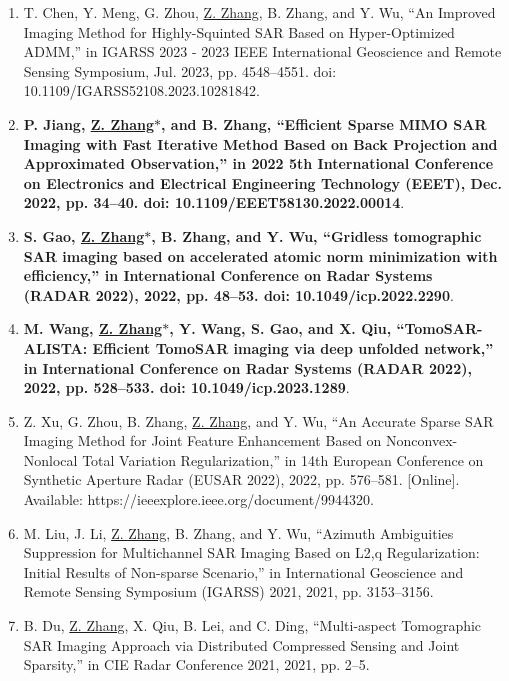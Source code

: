 \documentclass[paper=a4,fontsize=11pt]{scrartcl}
\begin{document}
\begin{enumerate}
\item T. Chen, Y. Meng, G. Zhou, \underline{Z. Zhang}, B. Zhang, and Y. Wu, ``An Improved Imaging Method for Highly-Squinted SAR Based on Hyper-Optimized ADMM,'' in IGARSS 2023 - 2023 IEEE International Geoscience and Remote Sensing Symposium, Jul. 2023, pp. 4548–4551. doi: 10.1109/IGARSS52108.2023.10281842.
	
\item \textbf{P. Jiang, \underline{Z. Zhang$\ast$}, and B. Zhang, ``Efficient Sparse MIMO SAR Imaging with Fast Iterative Method Based on Back Projection and Approximated Observation,'' in 2022 5th International Conference on Electronics and Electrical Engineering Technology (EEET), Dec. 2022, pp. 34–40. doi: 10.1109/EEET58130.2022.00014}.

\item \textbf{S. Gao, \underline{Z. Zhang$\ast$}, B. Zhang, and Y. Wu, ``Gridless tomographic SAR imaging based on accelerated atomic norm minimization with efficiency,'' in International Conference on Radar Systems (RADAR 2022), 2022, pp. 48–53. doi: 10.1049/icp.2022.2290}.

\item \textbf{M. Wang, \underline{Z. Zhang$\ast$}, Y. Wang, S. Gao, and X. Qiu, ``TomoSAR-ALISTA: Efficient TomoSAR imaging via deep unfolded network,'' in International Conference on Radar Systems (RADAR 2022), 2022, pp. 528–533. doi: 10.1049/icp.2023.1289}.

\item Z. Xu, G. Zhou, B. Zhang, \underline{Z. Zhang}, and Y. Wu, ``An Accurate Sparse SAR Imaging Method for Joint Feature Enhancement Based on Nonconvex-Nonlocal Total Variation Regularization,'' in 14th European Conference on Synthetic Aperture Radar (EUSAR 2022), 2022, pp. 576–581. [Online]. Available: https://ieeexplore.ieee.org/document/9944320.
	
\item M. Liu, J. Li, \underline{Z. Zhang}, B. Zhang, and Y. Wu, ``Azimuth Ambiguities Suppression for Multichannel SAR Imaging Based on L2,q Regularization: Initial Results of Non-sparse Scenario,'' in International Geoscience and Remote Sensing Symposium (IGARSS) 2021, 2021, pp. 3153–3156.

\item B. Du, \underline{Z. Zhang}, X. Qiu, B. Lei, and C. Ding, ``Multi-aspect Tomographic SAR Imaging Approach via Distributed Compressed Sensing and Joint Sparsity,'' in CIE Radar Conference 2021, 2021, pp. 2–5.
	

\end{enumerate}
\end{document}
